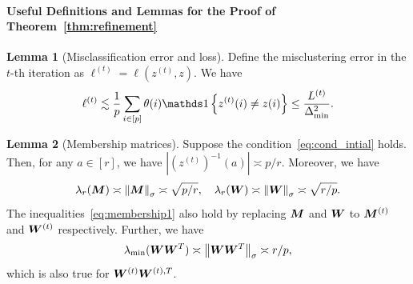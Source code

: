 \documentclass[lettersize,journal]{IEEEtran}
\theoremstyle{definition}
\newtheorem{lem}{Lemma}
\theoremstyle{definition}
\newcommand{\of}[1]{\left(#1\right)}
\newcommand{\offf}[1]{\left\{#1\right\}}
\begin{document}




\paragraph{Useful Definitions and Lemmas for the Proof of Theorem~\ref{thm:refinement}} 


\begin{lem}[Misclassification error and loss]\label{lem:mis} Define the misclustering error in the $t$-th iteration as $\ell^{(t)} = \ell(z^{(t)}, z)$. We have 
\begin{equation}
    \ell^{(t)} \lesssim \frac{1}{p}\sum_{i \in [p]} \theta(i) \ind\offf{ z^{(t)}(i) \neq z(i) } \leq \frac{L^{(t)}}{\Delta_{\min}^2}.
\end{equation}
\end{lem}

\begin{lem}[Membership matrices]\label{lem:membership} Suppose the condition~\eqref{eq:cond_intial} holds. Then, for any $a \in [r]$, we have $|\of{z^{(t)}}^{-1}(a)| \asymp p/r$. Moreover, we have 
\begin{equation}\label{eq:membership1}
    \lambda_{r}(\mM) \asymp \onorm{\mM}_{\sigma} \asymp \sqrt{p/r}, \quad  \lambda_{r}(\mW) \asymp \onorm{\mW}_{\sigma} \asymp \sqrt{r/p}.
\end{equation}
The inequalities~\eqref{eq:membership1} also hold by replacing $\bm M$ and $\bm{W}$ to $\bm M^{(t)}$ and $\bm{W}^{(t)}$ respectively. 
Further, we have 
\begin{equation}\label{eq:WWsingular}
   \lambda_{\min}(\mW\mW^T) \asymp \onorm{\mW\mW^T}_{\sigma} \asymp r/p,
\end{equation}
which is also true for $\bm{W}^{(t)}\bm{W}^{(t),T}$.
\end{lem}
\end{document}
